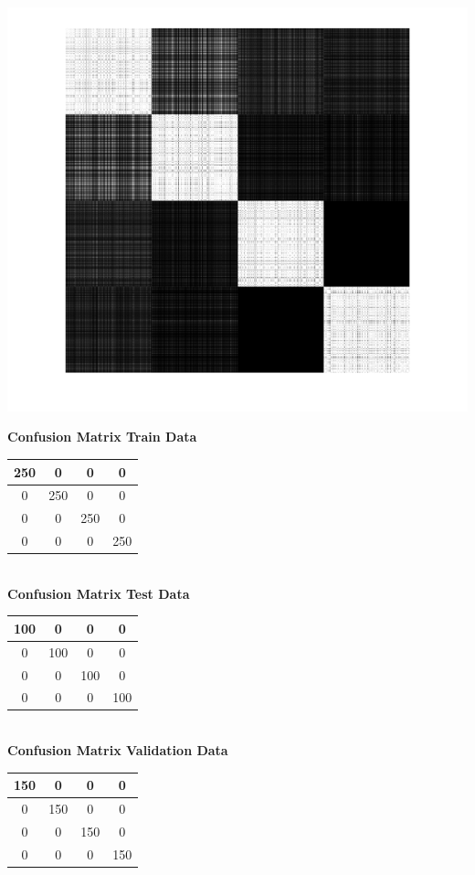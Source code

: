 \documentclass{article}
\begin{document}
\begin{center}
\includegraphics[scale=0.6]{Classification/1a/c_g/kgm}
\end{center}
\begin{flushleft}
\newpage
\textbf{Confusion Matrix Train Data\\[5pt]}
\begin{tabular}{|c|c|c|c|}
\hline
250 & 0 & 0 & 0 \\
\hline
0 & 250 & 0 & 0 \\
\hline
0 & 0 & 250 & 0 \\
\hline
0 & 0 & 0 & 250 \\
\hline
\end{tabular}
\textbf{\\[10pt] Confusion Matrix Test Data \\[5pt]}
\begin{tabular}{|c|c|c|c|}
\hline
100 & 0 & 0 & 0 \\
\hline
0 & 100 & 0 & 0 \\
\hline
0 & 0 & 100 & 0 \\
\hline
0 & 0 & 0 & 100 \\
\hline
\end{tabular}
\textbf{\\[10pt] Confusion Matrix Validation Data \\[5pt]}
\begin{tabular}{|c|c|c|c|}
\hline
150 & 0 & 0 & 0 \\
\hline
0 & 150 & 0 & 0 \\
\hline
0 & 0 & 150 & 0 \\
\hline
0 & 0 & 0 & 150 \\
\hline
\end{tabular}
\end{flushleft}
\end{document}
